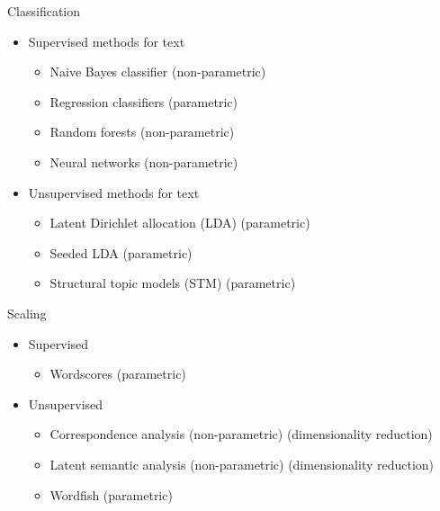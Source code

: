 \documentclass[pdf, 9pt, fleqn, handout]{beamer}
\begin{document}
\begin{frame}{Classification}
\begin{itemize}
\item Supervised methods for text \\[0.5em]
\begin{itemize}
\item Naive Bayes classifier (non-parametric) \\[0.5em]
\item Regression classifiers (parametric) \\[0.5em]
\item Random forests (non-parametric) \\[0.5em]
\item Neural networks (non-parametric) \\[2em]
\end{itemize}
\item Unsupervised methods for text \\[0.5em]
\begin{itemize}
\item Latent Dirichlet allocation (LDA) (parametric) \\[0.5em]
\item Seeded LDA  (parametric) \\[0.5em]
\item Structural topic models (STM) (parametric)
\end{itemize} 
\end{itemize}
\end{frame}

\begin{frame}{Scaling}
\begin{itemize}
\item Supervised \\[0.5em]
\begin{itemize}
\item Wordscores (parametric) \\[3em]
\end{itemize}
\item Unsupervised \\[0.5em]
\begin{itemize}
\item Correspondence analysis (non-parametric) (dimensionality reduction) \\[1em]
\item Latent semantic analysis (non-parametric) (dimensionality reduction) \\[1em]
\item Wordfish (parametric)
\end{itemize}
\end{itemize}
\end{frame}
\end{document}
